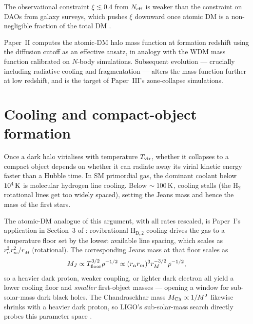\documentclass[12pt]{article}
\newcommand{\HDtwo}{\mathrm{H_{D,2}}}
\newcommand{\ra}{r_\alpha}
\newcommand{\rmm}{r_m}      %
\newcommand{\rM}{r_M}
\begin{document}
The observational constraint $\xi \lesssim 0.4$ from $N_{\rm eff}$ is
weaker than the constraint on DAOs from galaxy surveys, which pushes
$\xi$ downward once atomic DM is a non-negligible fraction of the
total DM \citep{CyrRacineSigurdson2013}.

Paper~II computes the atomic-DM halo mass function at formation
redshift using the diffusion cutoff as an effective ansatz, in analogy
with the WDM mass function calibrated on $N$-body simulations.
Subsequent evolution --- crucially including radiative cooling and
fragmentation --- alters the mass function further at low redshift,
and is the target of Paper~III's zone-collapse simulations.

\section{Cooling and compact-object formation}
\label{sec:cooling}

Once a dark halo virialises with temperature $T_{\rm vir}$, whether it
collapses to a compact object depends on whether it can radiate away
its virial kinetic energy faster than a Hubble time.  In SM primordial
gas, the dominant coolant below $10^4\,{\rm K}$ is molecular hydrogen
line cooling.  Below $\sim 100\,{\rm K}$, cooling stalls (the H$_2$
rotational lines get too widely spaced), setting the Jeans mass and
hence the mass of the first stars.

The atomic-DM analogue of this argument, with all rates rescaled, is
Paper~I's application in Section~3 of \citet{Ryan2022a}: rovibrational
$\HDtwo$ cooling drives the gas to a temperature floor set by the
lowest available line spacing, which scales as $\ra^2 \rmm^2/\rM$
(rotational).  The corresponding Jeans mass at that floor scales as
%
\begin{equation}
  M_J \propto T_{\rm floor}^{3/2} \rho^{-1/2}
        \propto (\ra \rmm)^3 \rM^{-3/2}\,\rho^{-1/2},
\end{equation}
%
so a heavier dark proton, weaker coupling, or lighter dark electron
all yield a lower cooling floor and \emph{smaller} first-object masses
--- opening a window for sub-solar-mass dark black holes.  The
Chandrasekhar mass $M_{\rm Ch} \propto 1/M^2$ likewise shrinks with a
heavier dark proton, so LIGO's sub-solar-mass search directly probes
this parameter space \citep{Shandera2018}.

\end{document}
